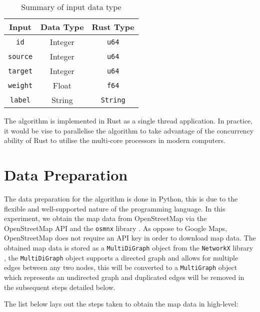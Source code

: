 \begin{table}[htbp]
    \begin{center}
        \caption{Summary of input data type}
        \label{tab:data_type}
        \begin{tabular}{ ccc }
            \hline
            \textbf{Input} & \textbf{Data Type} & \textbf{Rust Type} \\
            \hline
            \hline
            \verb|id| & Integer & \verb|u64| \\
            \hline
            \verb|source| & Integer & \verb|u64| \\
            \hline
            \verb|target| & Integer & \verb|u64| \\
            \hline
            \verb|weight| & Float & \verb|f64| \\
            \hline
            \verb|label| & String & \verb|String| \\
            \hline
        \end{tabular}
    \end{center}
\end{table}

The algorithm is implemented in Rust as a single thread application. In practice, it would be vise to parallelise the algorithm to take advantage of the concurrency ability of Rust to utilise the multi-core processors in modern computers.

\section{Data Preparation} \label{data_preparation}

The data preparation for the algorithm is done in Python, this is due to the flexible and well-supported nature of the programming language. In this experiment, we obtain the map data from OpenStreetMap via the OpenStreetMap API and the \verb|osmnx| library \cite{OSMnx}. As oppose to Google Maps, OpenStreetMap does not require an API key in order to download map data. The obtained map data is stored as a \verb|MultiDiGraph| object from the \verb|NetworkX| library \cite{SciPyProceedings_11}, the \verb|MultiDiGraph| object supports a directed graph and allows for multiple edges between any two nodes, this will be converted to a \verb|MultiGraph| object which represents an undirected graph and duplicated edges will be removed in the subsequent steps detailed below.

The list below lays out the steps taken to obtain the map data in high-level:

